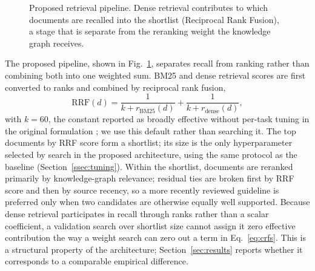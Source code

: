 \documentclass[10pt,conference]{IEEEtran}
\begin{document}
\begin{figure}[t]
\centering
{}
\caption{Proposed retrieval pipeline. Dense retrieval contributes to which documents are recalled into the shortlist (Reciprocal Rank Fusion), a stage that is separate from the reranking weight the knowledge graph receives.}
\label{fig:architecture}
\end{figure}

The proposed pipeline, shown in Fig.~\ref{fig:architecture}, separates recall from ranking rather than combining both into one weighted sum. BM25 and dense retrieval scores are first converted to ranks and combined by reciprocal rank fusion,
\begin{equation}
\text{RRF}(d) = \frac{1}{k + r_{\text{BM25}}(d)} + \frac{1}{k + r_{\text{dense}}(d)},
\label{eq:rrf}
\end{equation}
with $k=60$, the constant reported as broadly effective without per-task tuning in the original formulation \cite{cormack2009rrf}; we use this default rather than searching it. The top documents by RRF score form a shortlist; its size is the only hyperparameter selected by search in the proposed architecture, using the same protocol as the baseline (Section~\ref{ssec:tuning}). Within the shortlist, documents are reranked primarily by knowledge-graph relevance; residual ties are broken first by RRF score and then by source recency, so a more recently reviewed guideline is preferred only when two candidates are otherwise equally well supported. Because dense retrieval participates in recall through ranks rather than a scalar coefficient, a validation search over shortlist size cannot assign it zero effective contribution the way a weight search can zero out a term in Eq.~\eqref{eq:crfs}. This is a structural property of the architecture; Section~\ref{sec:results} reports whether it corresponds to a comparable empirical difference.
\end{document}
